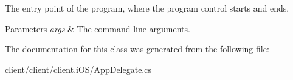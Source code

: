 The entry point of the program, where the program control starts and ends. 


\begin{DoxyParams}{Parameters}
{\em args} & The command-\/line arguments.\\
\hline
\end{DoxyParams}


The documentation for this class was generated from the following file\+:\begin{DoxyCompactItemize}
\item 
client/client/client.\+i\+O\+S/App\+Delegate.\+cs\end{DoxyCompactItemize}
